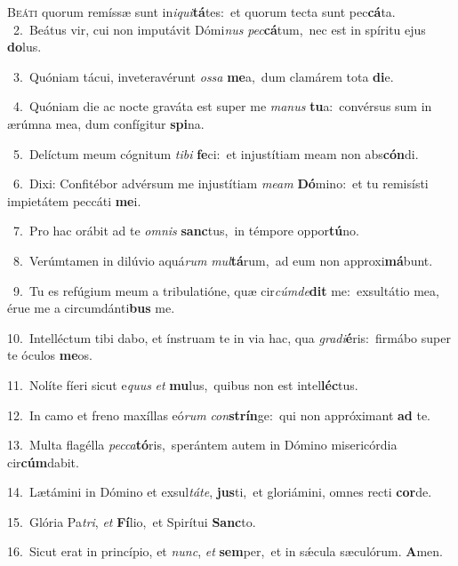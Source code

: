 \lettrine{\initial\textcolor{\initialcolor}{B}}{eáti} quorum remíssæ sunt in\-\textit{i}\-\textit{qui}\textbf{tá}tes:~\star et quorum tecta sunt pec\-\textbf{cá}\-ta.\\
{\numbfont\textcolor{\numbcolor}{~2.}}~Beátus vir, cui non imputávit Dómi\textit{nus} \textit{pec}\-\textbf{cá}tum,~\star nec est in spíritu ejus \textbf{do}\-lus.\par
{\numbfont\textcolor{\numbcolor}{~3.}}~Quóniam tácui, inveteravérunt \textit{os}\-\textit{sa} \textbf{me}\-a,~\star dum clamárem tota \textbf{di}\-e.\par
{\numbfont\textcolor{\numbcolor}{~4.}}~Quóniam die ac nocte graváta est super me \textit{ma}\-\textit{nus} \textbf{tu}\-a:~\star convérsus sum in ærúmna mea, dum confígitur \textbf{spi}\-na.\par
{\numbfont\textcolor{\numbcolor}{~5.}}~Delíctum meum cógnitum \textit{ti}\-\textit{bi} \textbf{fe}\-ci:~\star et injustítiam meam non abs\-\textbf{cón}\-di.\par
{\numbfont\textcolor{\numbcolor}{~6.}}~Dixi: Confitébor advérsum me injustítiam \textit{me}\-\textit{am} \textbf{Dó}\-mino:~\star et tu remisísti impietátem peccáti \textbf{me}\-i.\par
{\numbfont\textcolor{\numbcolor}{~7.}}~Pro hac orábit ad te \textit{om}\-\textit{nis} \textbf{sanc}\-tus,~\star in témpore oppor\-\textbf{tú}\-no.\par
{\numbfont\textcolor{\numbcolor}{~8.}}~Verúmtamen in dilúvio aquá\textit{rum} \textit{mul}\-\textbf{tá}rum,~\star ad eum non approxi\-\textbf{má}\-bunt.\par
{\numbfont\textcolor{\numbcolor}{~9.}}~Tu es refúgium meum a tribulatióne, quæ cir\-\textit{cúm}\-\textit{de}\textbf{dit} me:~\star exsultátio mea, érue me a circumdánti\textbf{bus} me.\par
{\numbfont\textcolor{\numbcolor}{10.}}~Intelléctum tibi dabo, et ínstruam te in via hac, qua \textit{gra}\-\textit{di}\textbf{é}ris:~\star firmábo super te óculos \textbf{me}\-os.\par
{\numbfont\textcolor{\numbcolor}{11.}}~Nolíte fíeri sicut e\textit{quus} \textit{et} \textbf{mu}\-lus,~\star quibus non est intel\-\textbf{léc}\-tus.\par
{\numbfont\textcolor{\numbcolor}{12.}}~In camo et freno maxíllas eó\textit{rum} \textit{con}\-\textbf{strín}ge:~\star qui non appróximant \textbf{ad} te.\par
{\numbfont\textcolor{\numbcolor}{13.}}~Multa flagélla \textit{pec}\-\textit{ca}\textbf{tó}ris,~\star sperántem autem in Dómino misericórdia cir\-\textbf{cúm}\-dabit.\par
{\numbfont\textcolor{\numbcolor}{14.}}~Lætámini in Dómino et exsul\-\textit{tá}\-\textit{te}, \textbf{jus}\-ti,~\star et gloriámini, omnes recti \textbf{cor}\-de.\par
{\numbfont\textcolor{\numbcolor}{15.}}~Glória Pa\-\textit{tri}\-, \textit{et} \textbf{Fí}\-lio,~\star et Spirítui \textbf{Sanc}\-to.\par
{\numbfont\textcolor{\numbcolor}{16.}}~Sicut erat in princípio, et \textit{nunc}\-, \textit{et} \textbf{sem}\-per,~\star et in sǽcula sæculórum. \textbf{A}\-men.\par
